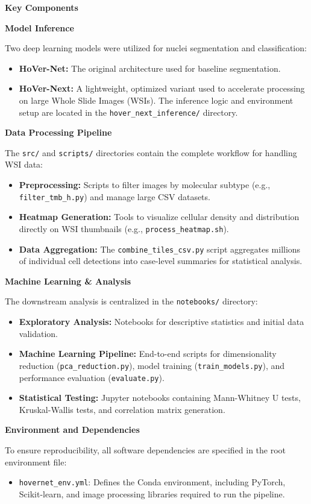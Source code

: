 \textbf{\Large Key Components}

\textbf{Model Inference}

Two deep learning models were utilized for nuclei segmentation and classification:
\begin{itemize}
    \item \textbf{HoVer-Net:} The original architecture used for baseline segmentation.
    \item \textbf{HoVer-Next:} A lightweight, optimized variant used to accelerate processing on large Whole Slide Images (WSIs). The inference logic and environment setup are located in the \texttt{hover\_next\_inference/} directory.
\end{itemize}

\textbf{Data Processing Pipeline}

The \texttt{src/} and \texttt{scripts/} directories contain the complete workflow for handling WSI data:
\begin{itemize}
    \item \textbf{Preprocessing:} Scripts to filter images by molecular subtype (e.g., \texttt{filter\_tmb\_h.py}) and manage large CSV datasets. 
    \item \textbf{Heatmap Generation:} Tools to visualize cellular density and distribution directly on WSI thumbnails (e.g., \texttt{process\_heatmap.sh}).
    \item \textbf{Data Aggregation:} The \texttt{combine\_tiles\_csv.py} script aggregates millions of individual cell detections into case-level summaries for statistical analysis.
\end{itemize}

\textbf{Machine Learning \& Analysis}

The downstream analysis is centralized in the \texttt{notebooks/} directory:
\begin{itemize}
    \item \textbf{Exploratory Analysis:} Notebooks for descriptive statistics and initial data validation.
    \item \textbf{Machine Learning Pipeline:} End-to-end scripts for dimensionality reduction (\texttt{pca\_reduction.py}), model training (\texttt{train\_models.py}), and performance evaluation (\texttt{evaluate.py}).
    \item \textbf{Statistical Testing:} Jupyter notebooks containing Mann-Whitney U tests, Kruskal-Wallis tests, and correlation matrix generation.
\end{itemize}

\textbf{\Large Environment and Dependencies}

To ensure reproducibility, all software dependencies are specified in the root environment file:
\begin{itemize}
    \item \texttt{hovernet\_env.yml}: Defines the Conda environment, including PyTorch, Scikit-learn, and image processing libraries required to run the pipeline.
\end{itemize}
    